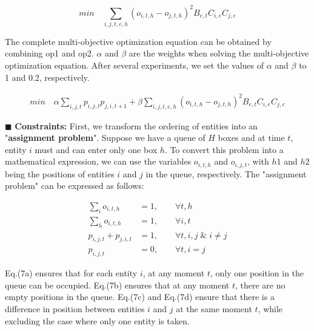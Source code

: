 \begin{equation}
	min \quad \sum_{i,j,t,e,h}(o_{i,t,h}-o_{j,t,h})^2B_{e,t}C_{i,e}C_{j,e}
\end{equation}

The complete multi-objective optimization equation can be obtained by combining op1 and op2. $\alpha$ and $\beta$ are the weights when solving the multi-objective optimization equation. After several experiments, we set the values of $\alpha$ and $\beta$ to 1 and 0.2, respectively.

\begin{equation}
\begin{split}
min \quad \alpha\sum_{i,j,t}p_{i,j,t}p_{j,i,t+1} + 
\beta\sum_{i,j,t,e,h}(o_{i,t,h}-o_{j,t,h})^2B_{e,t}C_{i,e}C_{j,e}
\end{split}
\end{equation}

$\blacksquare$ \textbf{Constraints:} First, we transform the ordering of entities into an "\textbf{assignment problem}". Suppose we have a queue of $H$ boxes and at time $t$, entity $i$ must and can enter only one box $h$. To convert this problem into a mathematical expression, we can use the variables $o_{i,t,h}$ and $o_{i,j,t}$, with $h1$ and $h2$ being the positions of entities $i$ and $j$ in the queue, respectively. The "assignment problem" can be expressed as follows:

\begin{subequations}
	\begin{align}
		\sum_io_{i,t,h}&=1, \quad\quad \forall t,h \\
		\sum_ho_{i,t,h}&=1, \quad\quad \forall i,t \\
		p_{i,j,t}+p_{j,i,t}&=1, \quad\quad \forall t,i,j\;\&\;i \neq j\\
		p_{i,j,t}&=0, \quad\quad \forall t,i=j 
	\end{align}
\end{subequations}

\noindent Eq.(7a) ensures that for each entity $i$, at any moment $t$, only one position in the queue can be occupied. Eq.(7b) ensures that at any moment $t$, there are no empty positions in the queue. Eq.(7c) and Eq.(7d) ensure that there is a difference in position between entities $i$ and $j$ at the same moment $t$, while excluding the case where only one entity is taken.

